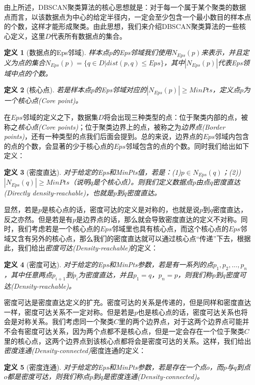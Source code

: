 \documentclass[UTF8, 12pt]{ctexart}
\newtheorem{thm}{定义}
\begin{document}
由上所述，DBSCAN聚类算法的核心思想就是：对于每一个属于某个聚类的数据点而言，以该数据点为中心的给定半径内，一定会至少包含一个最小数目的样本点的个数，这样才能形成聚类。由此思想，我们来介绍DBSCAN聚类算法的一些核心定义，这里$D$代表所有数据点的集合。
\begin{thm}[数据点的Eps邻域]
	样本点$p$的Eps邻域我们使用$N_{Eps}(p)$来表示，并且定义为点的集合$N_{Eps}(p)=\{q \in D| dist(p,q) \le Eps\}$，其中$|N_{Eps}(p)|$代表Eps领域中点的个数。
\end{thm}
\begin{thm}[核心点]
	若是样本点$p$的Eps邻域对应的$|N_{Eps}(p)| \geq MinPts$，定义点$p$为一个核心点(Core point)。
\end{thm}
在$Eps$邻域的定义之下，数据集$D$将会出现三种类型的点：位于聚类内部的点，被称之\emph{核心点(Core points)}；位于聚类边界上的点，被称之为\emph{边界点(Border points)}，还有一种类型的点我们后面会提到。总的来说，边界点的$Eps$邻域内包含的点的个数，会显著的少于核心点的$Eps$邻域包含的点的个数。同时我们给出如下定义：
\begin{thm}[密度直达]
	对于给定的Eps和MinPts值，若是：(1)$p \in N_{Eps}(q)$；(2))$|N_{Eps}(q)| \ge MinPts$（说明$q$是个核心点）。则我们定义数据点$p$由点$q$密度直达(Directly density-reachable)，也就是$p$到$q$密度直达。
\end{thm}

显然，若是$p$是核心点的话，密度可达的定义是对称的，也就是说$p$到$q$密度直达，反之亦然。但是若是有$p$是边界点的话，那么就会导致密度直达的定义不对称。同时，我们考虑若是一个核心点的$Eps$邻域里也具有核心点，而这个核心点的$Eps$邻域又含有另外的核心点，那么我们的密度直达就可以通过核心点“传递”下去，根据此，我们给出\emph{密度可达(Density-reachable)}的定义：
\begin{thm}[密度可达]
	对于给定的Eps和MinPts参数，若是有一系列的点$p_{1},p_{2},...,p_{n}$，其中任意两点$p_{i+1}$到$p_{i}$为密度直达，并且$p_{1}=q$，$p_{n}=p$，则我们称$p$到$q$密度可达(Density-reachable)。
\end{thm}

密度可达是密度直达定义的扩充。密度可达的关系是传递的，但是同样和密度直达一样，密度可达关系不一定对称。但是若是$p$也是核心点的话，密度可达关系也将会是对称关系。我们考虑同一个聚类$C$里的两个边界点，对于这两个边界点可能并不会有密度可达关系，因为两个点都不是核心点，但是一定会存在一个位于聚类$C$里的核心点，这两个边界点到该核心点都将会是密度可达的关系。这样，我们给出\emph{密度连通(Density-connected)}密度连通的定义：
\begin{thm}[密度连通]
	对于给定的Eps和MinPts参数，若是存在一个点$o$，而$p$与$q$到点$o$都是密度可达，则我们称点$p$到$q$是密度连通(Density-connected)。
\end{thm}
\end{document}
